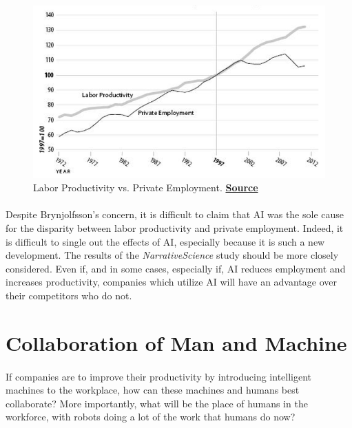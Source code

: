\documentclass{article}
\begin{document}
      \begin{figure}[ht]
        \centering
        \includegraphics[width=\textwidth,height=\textheight, keepaspectratio]{Figure2}
        \caption{Labor Productivity vs. Private Employment.
                 \href{http://www.techrepublic.com/article/ai-is-destroying-more-jobs-than-it-creates-what-it-means-and-how-we-can-stop-it/}
                 {\textbf{Source}}}
      \end{figure}

    \paragraph{}
      Despite Brynjolfsson's concern, it is difficult to claim that AI was
      the sole cause for the disparity between labor productivity and private
      employment. Indeed, it is difficult to single out the effects of AI,
      especially because it is such a new development. The results of the
      \textit{NarrativeScience} study should be more closely considered.
      Even if, and in some cases, especially if, AI reduces employment and
      increases productivity, companies which utilize AI will have an advantage
      over their competitors who do not.

  \section{Collaboration of Man and Machine}

    \paragraph{}
      If companies are to improve their productivity by introducing intelligent
      machines to the workplace, how can these machines
       and humans best collaborate? More importantly, what will be the place
      of humans in the workforce, with robots doing a lot of the work that humans
      do now?
\end{document}

